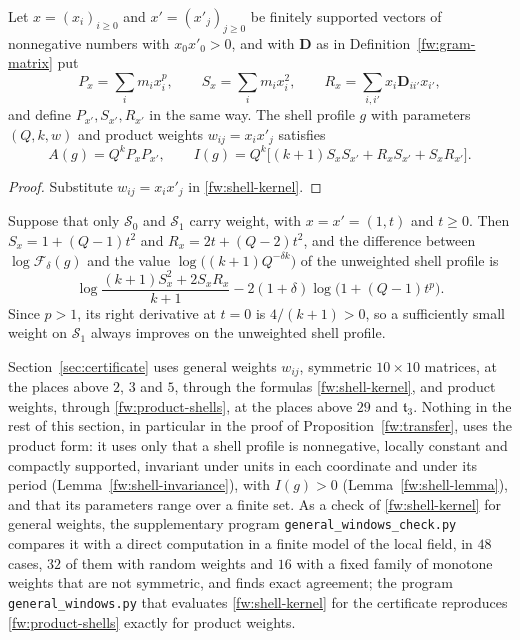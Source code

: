 \begin{corollary}\label{fw:product-weights}
Let $x=(x_i)_{i\ge0}$ and $x'=(x'_j)_{j\ge0}$ be finitely supported
vectors of nonnegative numbers with $x_0x'_0>0$, and with $\mathbf D$ as in
Definition~\ref{fw:gram-matrix} put
\[
 P_x=\sum_im_ix_i^p,\qquad S_x=\sum_im_ix_i^2,\qquad
 R_x=\sum_{i,i'}x_i\mathbf D_{ii'}x_{i'},
\]
and define $P_{x'},S_{x'},R_{x'}$ in the same way. The shell profile
$g$ with parameters $(Q,k,w)$ and product weights $w_{ij}=x_ix'_j$
satisfies
\begin{equation}\label{fw:product-shells}
 A(g)=Q^kP_xP_{x'},\qquad
 I(g)=Q^k\bigl[(k+1)S_xS_{x'}+R_xS_{x'}+S_xR_{x'}\bigr].
\end{equation}
\end{corollary}

\begin{proof}
Substitute $w_{ij}=x_ix'_j$ in \eqref{fw:shell-kernel}.
\end{proof}

\begin{remark}\label{fw:one-shell}
Suppose that only $\mathcal S_0$ and $\mathcal S_1$ carry weight, with
$x=x'=(1,t)$ and $t\ge0$. Then $S_x=1+(Q-1)t^2$ and
$R_x=2t+(Q-2)t^2$, and the difference between $\log\mathcal F_\delta(g)$
and the value $\log\bigl((k+1)Q^{-\delta k}\bigr)$ of the unweighted
shell profile is
\begin{equation}\label{fw:one-shell-gain}
 \log\frac{(k+1)S_x^2+2S_xR_x}{k+1}-2(1+\delta)\log\bigl(1+(Q-1)t^p\bigr).
\end{equation}
Since $p>1$, its right derivative at $t=0$ is $4/(k+1)>0$, so a
sufficiently small weight on $\mathcal S_1$ always improves on the
unweighted shell profile.
\end{remark}

\begin{remark}\label{fw:general-weights}
Section~\ref{sec:certificate} uses general weights $w_{ij}$, symmetric
$10\times10$ matrices, at the places above $2$, $3$ and $5$, through the
formulas \eqref{fw:shell-kernel}, and product weights, through
\eqref{fw:product-shells}, at the places above $29$ and $\mathfrak t_3$.
Nothing in the rest of this section, in particular in the proof of
Proposition~\ref{fw:transfer}, uses the product form: it uses only that a
shell profile is nonnegative, locally constant and compactly supported,
invariant under units in each coordinate and under its period
(Lemma~\ref{fw:shell-invariance}), with $I(g)>0$
(Lemma~\ref{fw:shell-lemma}), and that its parameters range over a finite
set. As a check of \eqref{fw:shell-kernel} for general weights, the
supplementary program \texttt{general\_windows\_check.py} compares it with a
direct computation in a finite model of the local field, in $48$ cases, $32$ of
them with random weights and $16$ with a fixed family of monotone weights that
are not symmetric, and finds exact agreement; the program \texttt{general\_windows.py} that evaluates
\eqref{fw:shell-kernel} for the certificate reproduces
\eqref{fw:product-shells} exactly for product weights.
\end{remark}


